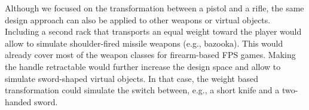 \documentclass{sigchi}
\begin{document}
Although we focused on the transformation between a pistol and a rifle, the same design approach can also be applied to other weapons or virtual objects. Including a second rack that transports an equal weight toward the player would allow to simulate shoulder-fired missile weapons (e.g., bazooka). This would already cover most of the weapon classes for firearm-based FPS games. Making the handle retractable would further increase the design space and allow to simulate sword-shaped virtual objects. In that case, the weight based transformation could simulate the switch between, e.g., a short knife and a two-handed sword.





%
%
%
%
%
\balance{}




\end{document}

